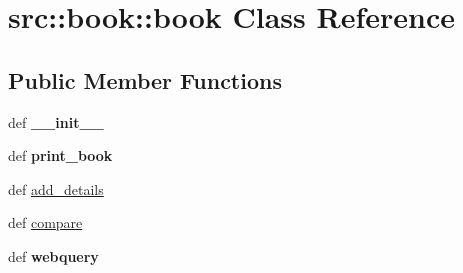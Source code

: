 \hypertarget{classsrc_1_1book_1_1book}{
\section{src::book::book Class Reference}
\label{classsrc_1_1book_1_1book}
}
\subsection*{Public Member Functions}
\begin{DoxyCompactItemize}
\item 
\hypertarget{classsrc_1_1book_1_1book_a80e3d1fc41a8d0f7d8fcda43fca726b5}{
def {\bfseries \_\-\_\-init\_\-\_\-}}
\label{classsrc_1_1book_1_1book_a80e3d1fc41a8d0f7d8fcda43fca726b5}

\item 
\hypertarget{classsrc_1_1book_1_1book_a4cc20b62cee96bf16d1cff87d14c01e7}{
def {\bfseries print\_\-book}}
\label{classsrc_1_1book_1_1book_a4cc20b62cee96bf16d1cff87d14c01e7}

\item 
def \hyperlink{classsrc_1_1book_1_1book_a07926ec1887a768e6728043f2d9e6850}{add\_\-details}
\item 
def \hyperlink{classsrc_1_1book_1_1book_a77fef223acc8f6866d9eb9d6db6dec18}{compare}
\item 
\hypertarget{classsrc_1_1book_1_1book_aee9ee185ca55480e227f544c0a743895}{
def {\bfseries webquery}}
\label{classsrc_1_1book_1_1book_aee9ee185ca55480e227f544c0a743895}

\end{DoxyCompactItemize}
